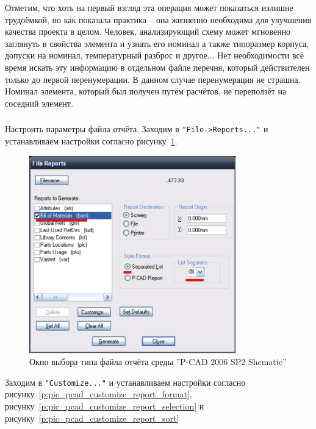 Отметим, что хоть на первый взгляд эта операция может показаться излишне трудоёмкой, но как показала практика -- она жизненно необходима для улучшения качества проекта в целом. Человек, анализирующий схему может мгновенно заглянуть в свойства элемента и узнать его номинал а также типоразмер корпуса, допуски на номинал, температурный разброс и другое... Нет необходимости всё время искать эту информацию в отдельном файле перечня, который действителен только до первой перенумерации. В данном случае перенумерация не страшна. Номинал элемента, который был получен путём расчётов, не переползёт на соседний элемент.

\subsubsection{}Настроить параметры файла отчёта. Заходим в \verb|"File->Reports..."|
и устанавливаем настройки согласно рисунку~\ref{p:pic_pcad_file_report}.

\begin{figure}[H]\center
  \includegraphics[width=0.8\textwidth]{VP_auto/pictures/pcad/pic_pcad_file_report}
  \caption{Окно выбора типа файла отчёта среды ''P-CAD 2006 SP2 Shematic''} \label{p:pic_pcad_file_report}
\end{figure}

\newpage
Заходим в \verb|"Customize..."| и устанавливаем настройки согласно рисунку~\ref{p:pic_pcad_customize_report_format}, рисунку~\ref{p:pic_pcad_customize_report_selection} и рисунку~\ref{p:pic_pcad_customize_report_sort}

